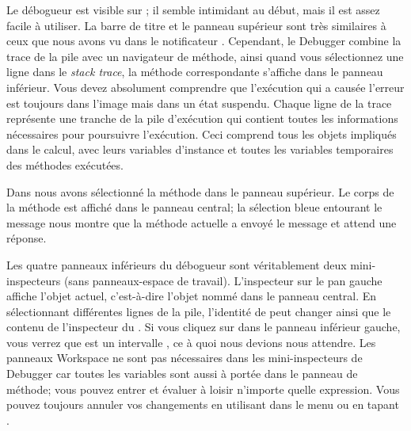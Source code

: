 \documentclass[a4paper,10pt,twoside]{book}
\begin{document}

Le d\'ebogueur est visible sur ; 
il semble intimidant au d\'ebut, mais il est assez facile \`a utiliser.
La barre de titre et le panneau sup\'erieur sont tr\`es similaires
\`a ceux que nous avons vu dans le notificateur .
Cependant, le Debugger combine la trace de la pile avec un navigateur de
m\'ethode, ainsi quand vous s\'electionnez une ligne dans le \emph{stack
trace}, la m\'ethode correspondante s'affiche dans le panneau inf\'erieur.
Vous devez absolument comprendre que l'ex\'ecution qui a caus\'ee l'erreur
est toujours dans l'image mais dans un \'etat suspendu.
Chaque ligne de la trace repr\'esente une tranche de la pile
d'ex\'ecution qui contient toutes les informations n\'ecessaires
pour poursuivre l'ex\'ecution. Ceci comprend tous les objets impliqu\'es
dans le calcul, avec leurs variables d'instance et toutes les variables
temporaires des m\'ethodes ex\'ecut\'ees.

Dans  nous avons s\'electionn\'e
la m\'ethode  dans le panneau sup\'erieur.
Le corps de la m\'ethode est affich\'e dans le panneau central;
la s\'election bleue entourant le message  nous montre
que la m\'ethode actuelle a envoy\'e le message  et
attend une r\'eponse.

Les quatre panneaux inf\'erieurs du d\'ebogueur sont v\'eritablement deux
mini-inspecteurs (sans panneaux-espace de travail).
L'inspecteur sur le pan gauche affiche l'objet actuel,
c'est-à-dire l'objet nomm\'e \self dans le panneau central.
En s\'electionnant diff\'erentes lignes de la pile, l'identit\'e de \self
peut changer ainsi que le contenu de
l'inspecteur du \self{}.
Si vous cliquez sur \self dans le panneau inf\'erieur gauche, vous verrez
que \self est un intervalle , ce \`a quoi nous devions
nous attendre.
Les panneaux Workspace ne sont pas n\'ecessaires dans les mini-inspecteurs
de Debugger car toutes les variables sont aussi \`a port\'ee dans
le panneau de m\'ethode; vous pouvez entrer et \'evaluer \`a loisir 
n'importe quelle expression.
Vous pouvez toujours annuler vos changements en utilisant 
 dans le menu ou en tapant . 
\end{document}
